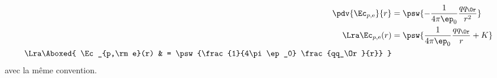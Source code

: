 \documentclass[../../main/main.tex]{subfiles}
\begin{document}
\begin{tcb*}
\begin{itemize}
      \smallbreak
		      \begin{minipage}{0.45\linewidth}
			      \begin{align*}
				      \pdv{\Ec_{p,\rm e}}{r}
              & =
              \psw{-\frac{1}{4\pi\ep_0} \frac{qq_\Or}{r^2}}
				      \\\Lra
				      \Ec_{p,\rm e}(r)
              & =
              \psw{\frac{1}{4\pi\ep_0} \frac{qq_\Or}{r} + K}
				      \\\Lra
				      \Aboxed{
				      \Ec_{p,\rm e}(r)
              & =
              \psw{\frac{1}{4\pi\ep_0} \frac{qq_\Or}{r}}
				      }
			      \end{align*}
			      avec la même convention.
		      \end{minipage}
		      \hfill
		      \begin{minipage}{0.45\linewidth}
			      \begin{center}
              \vspace{-15pt}
			      \end{center}
		      \end{minipage}
	\end{itemize}
  \vspace{-15pt}
\end{tcb*}
\vspace*{-15pt}
\end{document}
